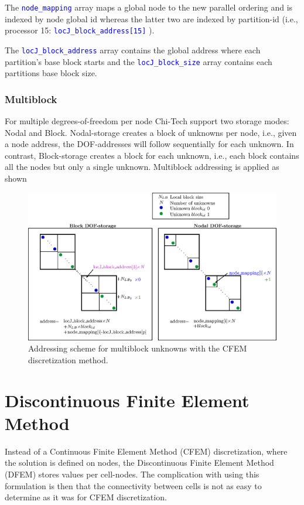 \documentclass[11pt,letterpaper,titlepage]{article}
\newcommand{\xmltag}[1]{\textcolor{blue}{ \texttt{#1}} }
\numberwithin{equation}{section}
\begin{document}
The \xmltag{node\_mapping} array maps a global node to the new parallel ordering and is indexed by node global id whereas the latter two are indexed by partition-id (i.e., processor 15: \xmltag{locJ\_block\_address[15]} ). 

The \xmltag{locJ\_block\_address} array contains the global address where each partition's base block starts and the \xmltag{locJ\_block\_size} array contains each partitions base block size.


\subsubsection{Multiblock}
For multiple degrees-of-freedom per node Chi-Tech support two storage modes: Nodal and Block. Nodal-storage creates a block of unknowns per node, i.e., given a node address, the DOF-addresses will follow sequentially for each unknown. In contrast, Block-storage creates a block for each unknown, i.e., each
block contains all the nodes but only a single unknown. Multiblock addressing is applied as shown

\begin{figure}[H]
\centering
\includegraphics[width=1.0\linewidth]{Figures/DiscretizationComponentBlockCFEM}
\caption{Addressing scheme for multiblock unknowns with the CFEM discretization method.}
\label{fig:discretizationcomponentblockcfem}
\end{figure}




\newpage
{}
\section{Discontinuous Finite Element Method}
Instead of a Continuous Finite Element Method (CFEM) discretization, 
where the solution is defined on nodes, the Discontinuous Finite Element
Method (DFEM) stores values per cell-nodes. The complication with using this formulation is then that the 
connectivity between cells is not as easy to determine as it was for 
CFEM discretization.
\end{document}
